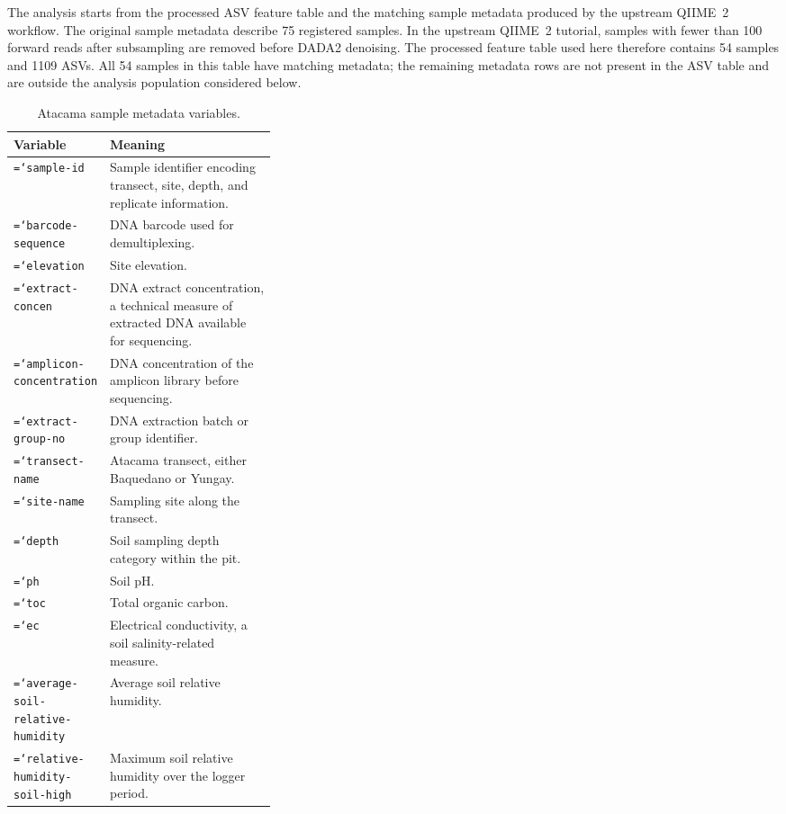 \documentclass[11pt,a4paper]{article}
\newcommand{\code}[1]{\allowbreak\texttt{\hyphenchar\font=`\-\relax #1}}
\begin{document}
The analysis starts from the processed ASV feature table and the matching
sample metadata produced by the upstream QIIME~2 workflow. The original sample
metadata describe 75 registered samples. In the upstream QIIME~2 tutorial,
samples with fewer than 100 forward reads after subsampling are removed before
DADA2 denoising. The processed feature table used here therefore contains 54
samples and 1109 ASVs. All 54 samples in this table have matching metadata; the
remaining metadata rows are not present in the ASV table and are outside the
analysis population considered below.

\begin{table}[htbp]
\centering
\scriptsize
\setlength{\tabcolsep}{4pt}
\renewcommand{\arraystretch}{0.95}
\caption{Atacama sample metadata variables.}
\label{tab:atacama-covariates}
\begin{tabularx}{\linewidth}{@{}>{\raggedright\arraybackslash}p{0.34\linewidth}>{\raggedright\arraybackslash}X@{}}
\toprule
\textbf{Variable} & \textbf{Meaning} \\
\midrule
\code{sample-id} & Sample identifier encoding transect, site, depth, and
replicate information. \\
\code{barcode-sequence} & DNA barcode used for demultiplexing. \\
\code{elevation} & Site elevation. \\
\code{extract-concen} & DNA extract concentration, a technical measure of
extracted DNA available for sequencing. \\
\code{amplicon-concentration} & DNA concentration of the amplicon library before
sequencing. \\
\code{extract-group-no} & DNA extraction batch or group identifier. \\
\code{transect-name} & Atacama transect, either Baquedano or Yungay. \\
\code{site-name} & Sampling site along the transect. \\
\code{depth} & Soil sampling depth category within the pit. \\
\code{ph} & Soil pH. \\
\code{toc} & Total organic carbon. \\
\code{ec} & Electrical conductivity, a soil salinity-related measure. \\
\code{average-soil-relative-humidity} & Average soil relative humidity. \\
\code{relative-humidity-soil-high} & Maximum soil relative humidity over the
logger period. \\

\end{tabularx}
\end{table}
\end{document}
